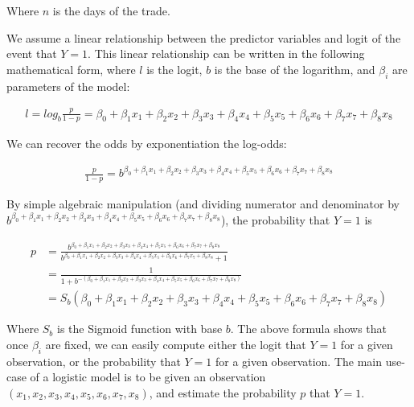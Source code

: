 \documentclass[11pt,english]{article}
\begin{document}
\begin{flushleft}
Where $n$ is the days of the trade.\newline

We assume a linear relationship between the predictor variables and logit of the event that $Y=1$. This linear relationship can be written in the following mathematical form, where $l$ is the logit, $b$ is the base of the logarithm, and $\beta _i$ are parameters of the model:

\begin{align}
    l = log_b \frac{p}{1 - p} = \beta_0 + \beta_1 x_1 + \beta_2 x_2 + 
    \beta_3 x_3 + \beta_4 x_4 + \beta_5 x_5 + \beta_6 x_6 + \beta_7 x_7 +
    \beta_8 x_8 \nonumber
\end{align}

We can recover the odds by exponentiation the log-odds:

\begin{align}
    \frac{p}{1 - p} = b^{\beta_0+\beta_1 x_1+\beta_2 x_2+\beta_3 x_3+
    \beta_4 x_4+\beta_5 x_5+\beta_6 x_6+\beta_7 x_7+\beta_8 x_8}\nonumber
\end{align}

By simple algebraic manipulation (and dividing numerator and denominator 
by\\ $ b^{\beta_0+\beta_1 x_1+\beta_2 x_2+\beta_3 x_3+\beta_4 x_4+\beta_5 x_5+
\beta_6 x_6+\beta_7 x_7+\beta_8 x_8}$), the probability that $Y=1$ is

\begin{align}
    p & = \frac{b^{\beta_0+\beta_1 x_1+\beta_2 x_2+\beta_3 x_3+
    \beta_4 x_4+\beta_5 x_5+\beta_6 x_6+\beta_7 x_7+\beta_8 x_8}}{b^{\beta_0+\beta_1 x_1+\beta_2 x_2+\beta_3 x_3+
    \beta_4 x_4+\beta_5 x_5+\beta_6 x_6+\beta_7 x_7+\beta_8 x_8} + 1}\nonumber\\
    & = \frac{1}{1 + b^{-(\beta_0+\beta_1 x_1+\beta_2 x_2+\beta_3 x_3+
    \beta_4 x_4+\beta_5 x_5+\beta_6 x_6+\beta_7 x_7+\beta_8 x_8)}}\nonumber\\
    & = S_b(\beta_0+\beta_1 x_1+\beta_2 x_2+\beta_3 x_3+
    \beta_4 x_4+\beta_5 x_5+\beta_6 x_6+\beta_7 x_7+\beta_8 x_8)\nonumber
\end{align}

Where $S_b$ is the Sigmoid function with base $b$. The above formula shows that once $\beta_i$ are fixed, we can easily compute either the logit that $Y=1$ for a given observation, or the probability that $Y=1$ for a given observation. The main use-case of a logistic model is to be given an observation $(x_1,x_2, x_3, x_4, x_5, x_6, x_7, x_8)$, and estimate the probability $p$ that $Y=1$.\newline


\end{flushleft}
\end{document}

